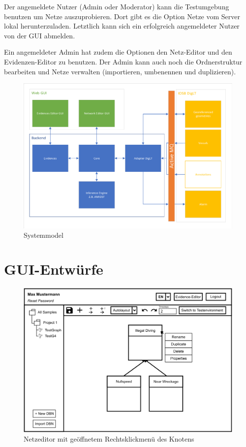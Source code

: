 \documentclass[parskip=full,11pt,twoside]{scrartcl}
\begin{document}
Der angemeldete Nutzer (Admin oder Moderator) kann die Testumgebung benutzen um Netze auszuprobieren. Dort gibt es die Option Netze vom Server lokal herunterzuladen. Letztlich kann sich ein erfolgreich angemeldeter Nutzer von der GUI abmelden.

Ein angemeldeter Admin hat zudem die Optionen den Netz-Editor und den Evidenzen-Editor zu benutzen. Der Admin kann auch noch die Ordnerstruktur bearbeiten und Netze verwalten (importieren, umbenennen und duplizieren). 

\newpage
\begin{figure}[h!]
   \centering
   \includegraphics[scale = 0.7]{image/PSE20191028.pdf}
   \caption{Systemmodel}
   \label{fig:Systemmodel}
\end{figure}

\newpage
\appendix
\section{GUI-Entwürfe}
\label{section:gui}

\begin{figure}[ht!]
    \includegraphics[scale = 0.8]{image/editor.png}
    \caption{Netzeditor mit geöffnetem Rechtsklickmenü des Knotens}
    \label{fig:neteditor}
\end{figure}
\end{document}
